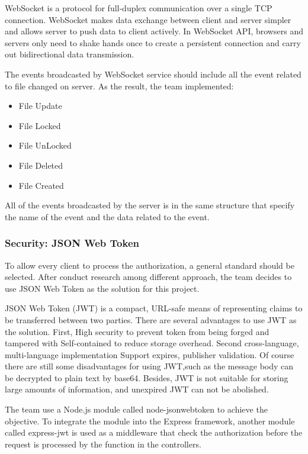 \documentclass{article}
\begin{document}
WebSocket is a protocol for full-duplex communication over a single TCP connection. WebSocket makes data exchange between client and server simpler and allows server to push data to client actively. \cite{c6}In WebSocket API, browsers and servers only need to shake hands once to create a persistent connection and carry out bidirectional data transmission.

The events broadcasted by WebSocket service should include all the event related to file changed on server. As the result, the team implemented:
\begin{itemize}
  \item File Update
  \item File Locked
  \item File UnLocked
  \item File Deleted
  \item File Created
\end{itemize}
All of the events broadcasted by the server is in the same structure that specify the name of the event and the data related to the event.

\subsubsection{Security: JSON Web Token}

To allow every client to process the authorization, a general standard should be selected. After conduct research among different approach, the team decides to use JSON Web Token as the solution for this project.

JSON Web Token (JWT) is a compact, URL-safe means of representing claims to be transferred between two parties. There are several advantages to use JWT as the solution.\cite{c7} First, High security to prevent token from being forged and tampered with Self-contained to reduce storage overhead. Second cross-language, multi-language implementation Support expires, publisher validation.
Of course there are still some disadvantages for using JWT,such as the message body can be decrypted to plain text by base64. Besides, JWT is not suitable for storing large amounts of information, and unexpired JWT can not be abolished.

The team use a Node.js module called node-jsonwebtoken to achieve the objective. To integrate the module into the Express framework, another module called express-jwt is used as a middleware that check the authorization before the request is processed by the function in the controllers. 
\end{document}

